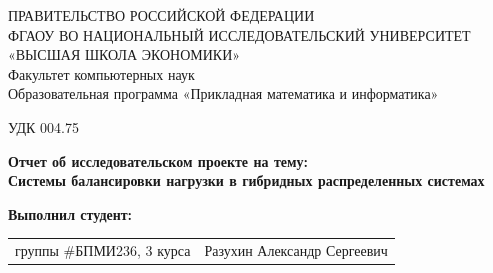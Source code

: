 \begin{titlepage}
\newpage

{
\begin{center}
ПРАВИТЕЛЬСТВО РОССИЙСКОЙ ФЕДЕРАЦИИ\\
ФГАОУ ВО НАЦИОНАЛЬНЫЙ ИССЛЕДОВАТЕЛЬСКИЙ УНИВЕРСИТЕТ\\
«ВЫСШАЯ ШКОЛА ЭКОНОМИКИ»
\\
\bigskip
Факультет компьютерных наук\\
Образовательная программа «Прикладная математика и информатика»
\end{center}
}

\vspace{2em}
УДК 004.75 %
\vspace{4em}

\begin{center}
{\bf Отчет об исследовательском проекте на тему:}\\
{\bf Системы балансировки нагрузки в гибридных распределенных системах }\\
\end{center}

\vspace{2em}

{\bf Выполнил студент: \vspace{2mm}}

{
\begin{tabular}{l@{\hskip 1.5cm}l}
группы \#БПМИ236, 3 курса & Разухин Александр Сергеевич \\
\end{tabular}}



\end{titlepage}
